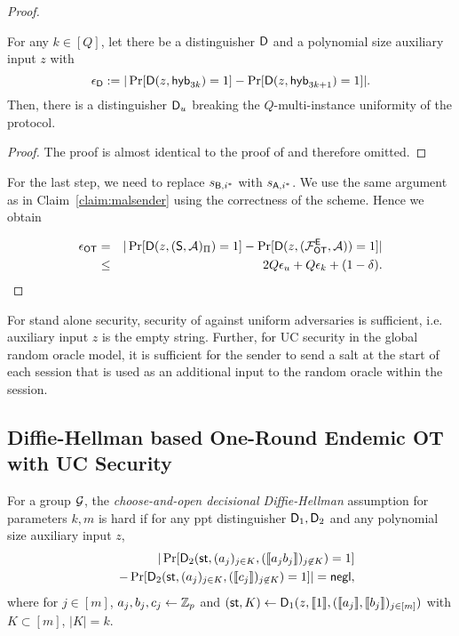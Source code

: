 \begin{proof}
\begin{claim}\label{claim:first}
For any $k\in[Q]$, let there be a distinguisher $\mathsf D$ and a polynomial size auxiliary input $z$ with
$$
\epsilon_{\mathsf D}:=|\Pr[\mathsf D(z,\mathsf{hyb}_{3k})=1] -\Pr[\mathsf D(z,\mathsf{hyb}_{3k+1})=1]|.
$$
Then, there is a distinguisher $\mathsf D_u$ breaking the $Q$-multi-instance uniformity of the \UKA protocol.
\end{claim}

\begin{proof}
The proof is almost identical to the proof of  and therefore omitted.
\pe
\end{proof}

For the last step, we need to replace $s_{\mathsf{B},i^*}$ with $s_{\mathsf{A},i^*}$. We use the same argument as in Claim~\ref{claim:malsender} using the correctness of the scheme. Hence we obtain

\begin{eqnarray*}
\epsilon_{\mathsf{OT}} &=&|\Pr[\mathsf D(z,(\mathsf{S}, \mathcal{A})_{\Pi})=1] -\Pr[\mathsf D(z,(\mathcal{F}_{\mathsf{OT}}^\mathsf{E},\mathcal{A}))=1]|\\
&\leq &2Q\epsilon_{u}+Q\epsilon_{k}+(1-\delta).
\end{eqnarray*}
\pe
\end{proof}


\begin{remark}
For stand alone security, security of \UKA against uniform adversaries is sufficient, i.e. auxiliary input $z$ is the empty string. Further, for UC security in the global random oracle model, it is sufficient for the sender to send a salt at the start of each session that is used as an additional input to the random oracle within the session. 
\end{remark}







\subsection{Diffie-Hellman based One-Round Endemic OT with UC Security }\label{sec:ddhProof}



\begin{definition}\label{def:CODDH}
	For a group $\mathcal{G}$, the \emph{choose-and-open decisional Diffie-Hellman} assumption for parameters $k,m$ is hard if for any ppt distinguisher $\mathsf D_1,\mathsf D_2$ and any polynomial size auxiliary input $z$,
	\begin{eqnarray*}
		&&|\Pr[ \mathsf D_2(\mathsf{st},(a_j)_{j\in K},(\llbracket a_{j}b_{j}\rrbracket)_{j\not\in K})=1]\\
		&&-\Pr[ \mathsf D_2(\mathsf{st},(a_j)_{j\in K},(\llbracket c_{j}\rrbracket)_{j\not\in K})=1]|=\mathsf{negl},
	\end{eqnarray*}
	where for $j\in[m]$, $a_j,b_j,c_j\leftarrow\mathbb Z_p$ and $(\mathsf{st}, K)\leftarrow\mathsf D_1(z, \llbracket 1\rrbracket, (\llbracket a_j\rrbracket,\llbracket b_j\rrbracket)_{j\in [m]})$ with $K\subset[m]$, $|K|=k$.
\end{definition}

